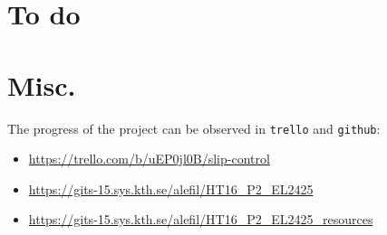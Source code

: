 \documentclass[oneside,12pt]{article}
\begin{document}
\section{To do}


\section{Misc.}

The progress of the project can be observed in \texttt{trello} and \texttt{github}:

\begin{itemize}
  \item \url{https://trello.com/b/uEP0jl0B/slip-control}
  \item \url{https://gits-15.sys.kth.se/alefil/HT16_P2_EL2425}
  \item \url{https://gits-15.sys.kth.se/alefil/HT16_P2_EL2425_resources}
\end{itemize}
\end{document}
